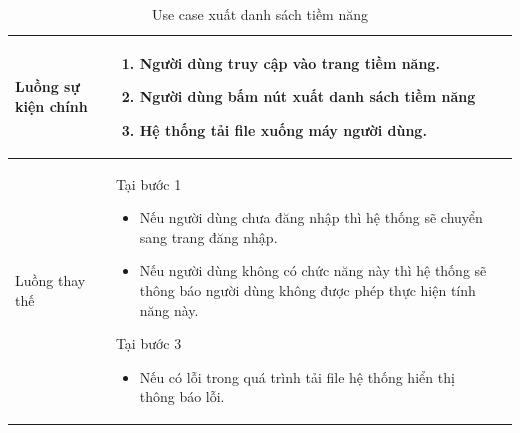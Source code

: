 \documentclass[12pt,a4paper]{article}
\begin{document}
\begin{table}[H]
\begin{tabular}{|p{3.5cm}|p{11.5cm}|c|}
            Luồng sự kiện chính & \vspace{-.8cm}\begin{enumerate}
                                                    \item Người dùng truy cập vào trang tiềm năng.
                                                    \item Người dùng bấm nút xuất danh sách tiềm năng
                                                    \item Hệ thống tải file xuống máy người dùng.
            \end{enumerate}
            \\
            \hline
            Luồng thay thế & Tại bước 1\newline
            \vspace{-.8cm}\begin{itemize}
                              \item Nếu người dùng chưa đăng nhập thì hệ thống sẽ chuyển sang trang đăng nhập.
                              \item Nếu người dùng không có chức năng này thì hệ thống sẽ thông báo người dùng không được phép thực hiện tính năng này.
            \end{itemize}
            Tại bước 3\newline
            \vspace{-.8cm}\begin{itemize}
                              \item Nếu có lỗi trong quá trình tải file hệ thống hiển thị thông báo lỗi.
            \end{itemize}
            \\ \hline
        \end{tabular}
        \caption{Use case xuất danh sách tiềm năng}
    \end{table}


\end{document}
